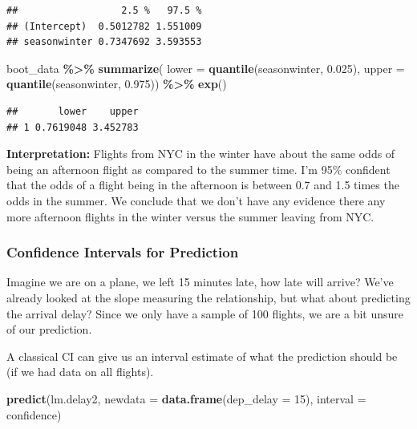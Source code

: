 \documentclass[
]{book}
\newenvironment{Shaded}{\begin{snugshade}}{\end{snugshade}}
\newcommand{\AttributeTok}[1]{\textcolor[rgb]{0.13,0.29,0.53}{#1}}
\newcommand{\DecValTok}[1]{\textcolor[rgb]{0.00,0.00,0.81}{#1}}
\newcommand{\FloatTok}[1]{\textcolor[rgb]{0.00,0.00,0.81}{#1}}
\newcommand{\FunctionTok}[1]{\textcolor[rgb]{0.13,0.29,0.53}{\textbf{#1}}}
\newcommand{\NormalTok}[1]{#1}
\newcommand{\SpecialCharTok}[1]{\textcolor[rgb]{0.81,0.36,0.00}{\textbf{#1}}}
\newcommand{\StringTok}[1]{\textcolor[rgb]{0.31,0.60,0.02}{#1}}
\begin{document}
\begin{verbatim}
##                  2.5 %   97.5 %
## (Intercept)  0.5012782 1.551009
## seasonwinter 0.7347692 3.593553
\end{verbatim}

\begin{Shaded}
\begin{Highlighting}[]
\NormalTok{boot\_data }\SpecialCharTok{\%\textgreater{}\%}
  \FunctionTok{summarize}\NormalTok{(}
    \AttributeTok{lower =} \FunctionTok{quantile}\NormalTok{(seasonwinter, }\FloatTok{0.025}\NormalTok{),}
    \AttributeTok{upper =} \FunctionTok{quantile}\NormalTok{(seasonwinter, }\FloatTok{0.975}\NormalTok{)) }\SpecialCharTok{\%\textgreater{}\%}
  \FunctionTok{exp}\NormalTok{()}
\end{Highlighting}
\end{Shaded}

\begin{verbatim}
##       lower    upper
## 1 0.7619048 3.452783
\end{verbatim}

\textbf{Interpretation:} Flights from NYC in the winter have about the same odds of being an afternoon flight as compared to the summer time. I'm 95\% confident that the odds of a flight being in the afternoon is between 0.7 and 1.5 times the odds in the summer. We conclude that we don't have any evidence there any more afternoon flights in the winter versus the summer leaving from NYC.

\subsubsection{Confidence Intervals for Prediction}\label{confidence-intervals-for-prediction}

Imagine we are on a plane, we left 15 minutes late, how late will arrive? We've already looked at the slope measuring the relationship, but what about predicting the arrival delay? Since we only have a sample of 100 flights, we are a bit unsure of our prediction.

A classical CI can give us an interval estimate of what the prediction should be (if we had data on all flights).

\begin{Shaded}
\begin{Highlighting}[]
\FunctionTok{predict}\NormalTok{(lm.delay2, }\AttributeTok{newdata =} \FunctionTok{data.frame}\NormalTok{(}\AttributeTok{dep\_delay =} \DecValTok{15}\NormalTok{), }\AttributeTok{interval =} \StringTok{\textquotesingle{}confidence\textquotesingle{}}\NormalTok{)}
\end{Highlighting}
\end{Shaded}
\end{document}
